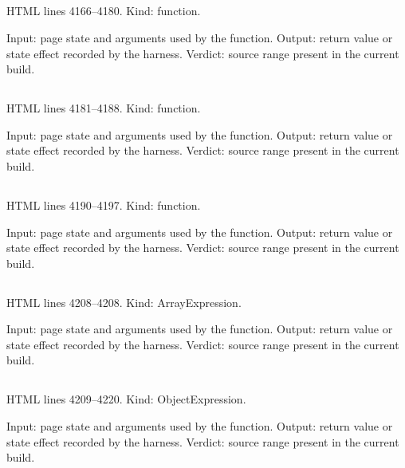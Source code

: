 \subsection*{\texttt{}}
\label{vf_150_makeXlsx}
HTML lines 4166--4180. Kind: function.

Input: page state and arguments used by the function.
Output: return value or state effect recorded by the harness.
Verdict: source range present in the current build.

\subsection*{\texttt{}}
\label{vf_151_qsWorkbook}
HTML lines 4181--4188. Kind: function.

Input: page state and arguments used by the function.
Output: return value or state effect recorded by the harness.
Verdict: source range present in the current build.

\subsection*{\texttt{}}
\label{vf_152_reviewForensicEvents}
HTML lines 4190--4197. Kind: function.

Input: page state and arguments used by the function.
Output: return value or state effect recorded by the harness.
Verdict: source range present in the current build.

\subsection*{\texttt{}}
\label{vf_153_SOP_OUTCOMES}
HTML lines 4208--4208. Kind: ArrayExpression.

Input: page state and arguments used by the function.
Output: return value or state effect recorded by the harness.
Verdict: source range present in the current build.

\subsection*{\texttt{}}
\label{vf_154_SOP_OUTCOME_DEFAULTS}
HTML lines 4209--4220. Kind: ObjectExpression.

Input: page state and arguments used by the function.
Output: return value or state effect recorded by the harness.
Verdict: source range present in the current build.

